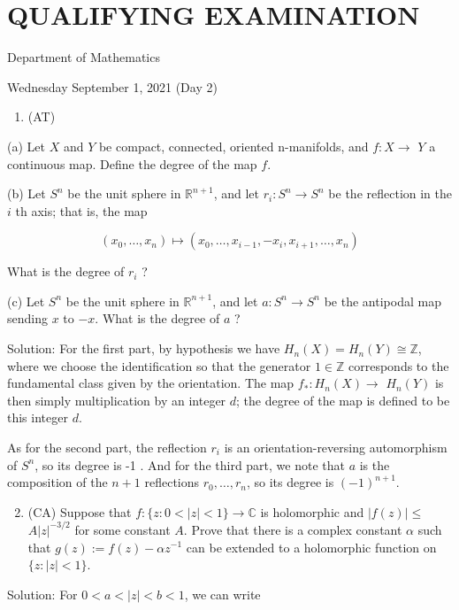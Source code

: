 \documentclass[10pt]{article}
\begin{document}
\section*{QUALIFYING EXAMINATION }
Department of Mathematics

Wednesday September 1, 2021 (Day 2)

\begin{enumerate}
  \item (AT)
\end{enumerate}

(a) Let $X$ and $Y$ be compact, connected, oriented n-manifolds, and $f: X \rightarrow$ $Y$ a continuous map. Define the degree of the map $f$.

(b) Let $S^{n}$ be the unit sphere in $\mathbb{R}^{n+1}$, and let $r_{i}: S^{n} \rightarrow S^{n}$ be the reflection in the $i$ th axis; that is, the map

$$
\left(x_{0}, \ldots, x_{n}\right) \mapsto\left(x_{0}, \ldots, x_{i-1},-x_{i}, x_{i+1}, \ldots, x_{n}\right)
$$

What is the degree of $r_{i}$ ?

(c) Let $S^{n}$ be the unit sphere in $\mathbb{R}^{n+1}$, and let $a: S^{n} \rightarrow S^{n}$ be the antipodal map sending $x$ to $-x$. What is the degree of $a$ ?

Solution: For the first part, by hypothesis we have $H_{n}(X)=H_{n}(Y) \cong \mathbb{Z}$, where we choose the identification so that the generator $1 \in \mathbb{Z}$ corresponds to the fundamental class given by the orientation. The map $f_{*}: H_{n}(X) \rightarrow$ $H_{n}(Y)$ is then simply multiplication by an integer $d$; the degree of the map is defined to be this integer $d$.

As for the second part, the reflection $r_{i}$ is an orientation-reversing automorphism of $S^{n}$, so its degree is -1 . And for the third part, we note that $a$ is the composition of the $n+1$ reflections $r_{0}, \ldots, r_{n}$, so its degree is $(-1)^{n+1}$.

\begin{enumerate}
  \setcounter{enumi}{1}
  \item (CA) Suppose that $f:\{z: 0<|z|<1\} \rightarrow \mathbb{C}$ is holomorphic and $|f(z)| \leq$ $A|z|^{-3 / 2}$ for some constant $A$. Prove that there is a complex constant $\alpha$ such that $g(z):=f(z)-\alpha z^{-1}$ can be extended to a holomorphic function on $\{z:|z|<1\}$.
\end{enumerate}

Solution: For $0<a<|z|<b<1$, we can write
\end{document}
